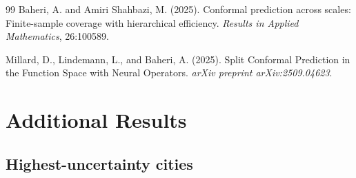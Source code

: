 \documentclass[11pt,a4paper]{report}
\begin{document}
\begin{thebibliography}{99}
Baheri, A. and Amiri Shahbazi, M. (2025).
Conformal prediction across scales: Finite-sample coverage with hierarchical efficiency.
\textit{Results in Applied Mathematics}, 26:100589.

Millard, D., Lindemann, L., and Baheri, A. (2025).
Split Conformal Prediction in the Function Space with Neural Operators.
\textit{arXiv preprint arXiv:2509.04623}.

\end{thebibliography}
\appendix
\chapter{Additional Results}
\label{ch:appendix}

\section{Highest-uncertainty cities}
\end{document}
